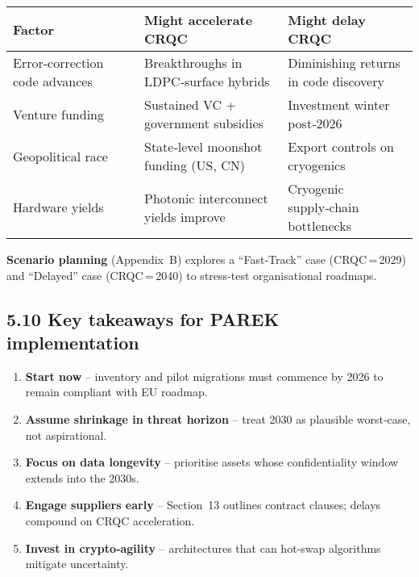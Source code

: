 \documentclass[
  english,
]{article}
\providecommand{\tightlist}{%
  \setlength{\itemsep}{0pt}\setlength{\parskip}{0pt}}
\begin{document}
\begin{longtable}[]{@{}
  >{\raggedright\arraybackslash}p{}
  >{\raggedright\arraybackslash}p{}
  >{\raggedright\arraybackslash}p{}@{}}
\toprule\noalign{}
\begin{minipage}[b]{\linewidth}\raggedright
Factor
\end{minipage} & \begin{minipage}[b]{\linewidth}\raggedright
Might \textbf{accelerate} CRQC
\end{minipage} & \begin{minipage}[b]{\linewidth}\raggedright
Might \textbf{delay} CRQC
\end{minipage} \\
\midrule\noalign{}
\endhead
\bottomrule\noalign{}
\endlastfoot
Error‑correction code advances & Breakthroughs in LDPC‑surface hybrids &
Diminishing returns in code discovery \\
Venture funding & Sustained VC + government subsidies & Investment
winter post‑2026 \\
Geopolitical race & State‑level moonshot funding (US, CN) & Export
controls on cryogenics \\
Hardware yields & Photonic interconnect yields improve & Cryogenic
supply‑chain bottlenecks \\
\end{longtable}

\textbf{Scenario planning} (Appendix~B) explores a ``Fast‑Track'' case
(CRQC\,=\,2029) and ``Delayed'' case (CRQC\,=\,2040) to stress‑test
organisational roadmaps.

\subsection{5.10 Key takeaways for PAREK
implementation}\label{key-takeaways-for-parek-implementation}

\begin{enumerate}
\def\labelenumi{\arabic{enumi}.}
\tightlist
\item
  \textbf{Start now} -- inventory and pilot migrations must commence by
  2026 to remain compliant with EU roadmap.
\item
  \textbf{Assume shrinkage in threat horizon} -- treat 2030 as plausible
  worst‑case, not aspirational.
\item
  \textbf{Focus on data longevity} -- prioritise assets whose
  confidentiality window extends into the 2030s.
\item
  \textbf{Engage suppliers early} -- Section~13 outlines contract
  clauses; delays compound on CRQC acceleration.
\item
  \textbf{Invest in crypto‑agility} -- architectures that can hot‑swap
  algorithms mitigate uncertainty.
\end{enumerate}
\end{document}
